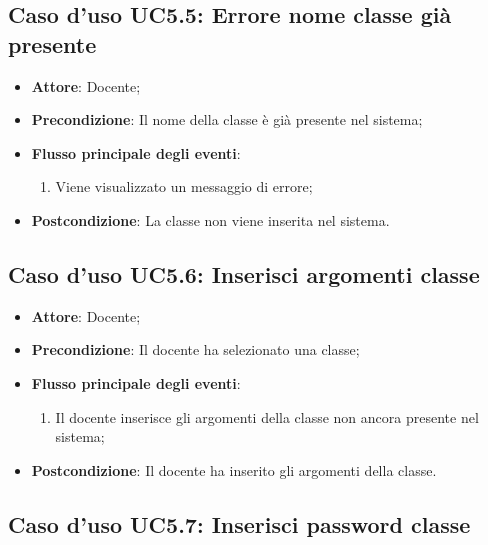 \documentclass[12pt,a4paper]{article}
\begin{document}
\subsection{Caso d'uso UC5.5: Errore nome classe già presente}

\begin{itemize}

\item \textbf{Attore}: Docente; 
\item \textbf{Precondizione}: Il nome della classe è già presente nel sistema;

\item \textbf{Flusso principale degli eventi}:
\begin{enumerate}
	\item Viene visualizzato un messaggio di errore;
	
\end{enumerate}
\item \textbf{Postcondizione}: La classe non viene inserita nel sistema.
\end{itemize}
\hypertarget{UC5.6}{}
\subsection{Caso d'uso UC5.6: Inserisci argomenti classe}

\begin{itemize}

\item \textbf{Attore}: Docente; 
\item \textbf{Precondizione}: Il docente ha selezionato una classe;

\item \textbf{Flusso principale degli eventi}:
\begin{enumerate}
	\item Il docente inserisce gli argomenti della classe non ancora presente nel sistema;
	
\end{enumerate}
\item \textbf{Postcondizione}: Il docente ha inserito gli argomenti della classe.
\end{itemize}
\hypertarget{UC5.7}{}
\subsection{Caso d'uso UC5.7: Inserisci password classe}
\end{document}
